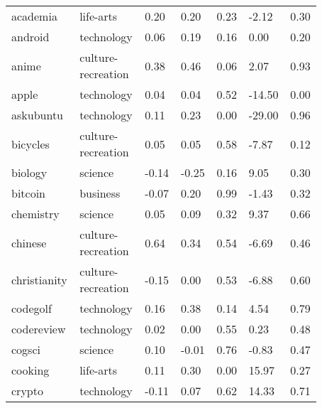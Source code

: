\begin{longtabu}{@{}
	p{0.17\linewidth}
	p{0.2\linewidth}
	P{0.1\linewidth}
	P{0.1\linewidth}
	P{0.1\linewidth}
	P{0.1\linewidth}
	p{0.1\linewidth}@{}}
\\
\endlastfoot
academia         & life-arts          & 0.20           & 0.20           & 0.23   & -2.12             & 0.30             \\
android          & technology         & 0.06           & 0.19           & 0.16   & 0.00              & 0.20             \\
anime            & culture-recreation & 0.38           & 0.46           & 0.06   & 2.07              & 0.93             \\
apple            & technology         & 0.04           & 0.04           & 0.52   & -14.50            & 0.00             \\
askubuntu        & technology         & 0.11           & 0.23           & 0.00   & -29.00            & 0.96             \\
bicycles         & culture-recreation & 0.05           & 0.05           & 0.58   & -7.87             & 0.12             \\
biology          & science            & -0.14          & -0.25          & 0.16   & 9.05              & 0.30             \\
bitcoin          & business           & -0.07          & 0.20           & 0.99   & -1.43             & 0.32             \\
chemistry        & science            & 0.05           & 0.09           & 0.32   & 9.37              & 0.66             \\
chinese          & culture-recreation & 0.64           & 0.34           & 0.54   & -6.69             & 0.46             \\
christianity     & culture-recreation & -0.15          & 0.00           & 0.53   & -6.88             & 0.60             \\
codegolf         & technology         & 0.16           & 0.38           & 0.14   & 4.54              & 0.79             \\
codereview       & technology         & 0.02           & 0.00           & 0.55   & 0.23              & 0.48             \\
cogsci           & science            & 0.10           & -0.01          & 0.76   & -0.83             & 0.47             \\
cooking          & life-arts          & 0.11           & 0.30           & 0.00   & 15.97             & 0.27             \\
crypto           & technology         & -0.11          & 0.07           & 0.62   & 14.33             & 0.71             \\

\end{longtabu}
